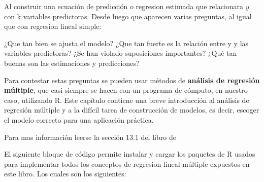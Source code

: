 \documentclass[
]{book}
\begin{document}
Al construir una ecuación de predicción o regresion estimada que relacionara \(y\) con k variables predictoras. Desde luego que aparecen varias preguntas, al igual que con regresion lineal simple:

¿Que tan bien se ajusta el modelo?
¿Que tan fuerte es la relación entre y y las variables predictoras?
¿Se han violado suposiciones importantes?
¿Qué tan buenas son las estimaciones y predicciones?

Para contestar estas preguntas se pueden usar métodos de \textbf{análisis de regresión múltiple}, que casi siempre se hacen con un programa de cómputo, en nuestro caso, utilizando R. Este capítulo contiene una breve introducción al análisis de regresión múltiple y a la difícil tarea de construcción de
modelos, es decir, escoger el modelo correcto para una aplicación práctica.

Para mas información leerse la sección 13.1 del libro de \citet{mendenhall2010introduccion}

El siguiente bloque de código permite instalar y cargar los paquetes de R usados para implementar todos los conceptos de regresion lineal múltiple expuestos en este libro. Los cuales son los siguientes:
\end{document}

